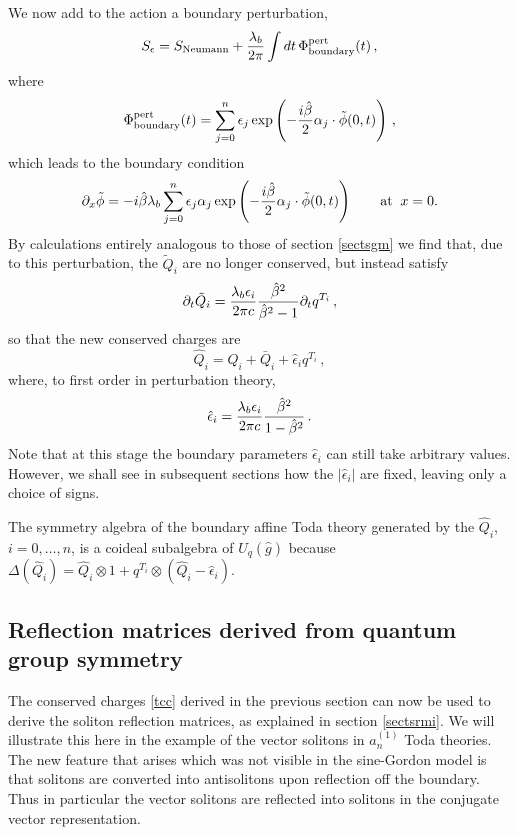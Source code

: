 \documentclass[a4paper,12pt]{article}
\newcommand{\hb}{\hat{\beta}}
\newcommand{\uqgh}{U_q(\hat{g})}
\numberwithin{equation}{section}
\begin{document}
We now add to the action a boundary perturbation, \begin{equation}
S_\epsilon = S_{\rm Neumann} +{\lambda_b\over 2\pi}\int dt\,
\Phi^{\rm pert}_{\rm boundary}(t)\,,\end{equation} where
\begin{equation}\Phi^{\rm pert}_{\rm boundary}(t) = \sum_{j=0}^n
\epsilon_j \exp\left( -{i\hb\over 2}\alpha_j\cdot\tilde{\phi}(0,t)
\right)\,,\end{equation} which leads to the boundary condition
\begin{equation}
\partial_x\tilde{\phi} = -i\hb\lambda_b \sum_{j=0}^n \epsilon_j
\alpha_j\exp\left( -{i\hb\over 2}\alpha_j\cdot\tilde{\phi}(0,t)
\right)\qquad {\rm at}\;\;x=0.\end{equation} By calculations
entirely analogous to those of section \ref{sectsgm} we find that,
due to this perturbation, the $\tilde{Q}_i$ are no longer
conserved, but instead satisfy \begin{equation} \partial_t
\tilde{Q}_i = {\lambda_b\epsilon_i\over 2\pi c} {\hb^2\over
\hb^2-1}\partial_t q^{T_i}\,,\end{equation} so that the new
conserved charges are
\begin{equation}\label{tcc}
  \widehat{Q}_i = Q_i + \bar{Q}_i +
  \hat{\epsilon}_i q^{T_i}\,,
\end{equation}
where, to first order
in perturbation theory,
\begin{equation} \hat{\epsilon}_i =
{\lambda_b\epsilon_i\over 2\pi c} {\hb^2\over 1-\hb^2}\,.
\end{equation}
Note that at this stage the boundary parameters $\hat{\epsilon}_i$
can still take arbitrary values. However, we shall see in
subsequent sections how the $|\hat{\epsilon}_i|$ are fixed,
leaving only a choice of signs.


The symmetry algebra of the boundary affine Toda theory generated
by the $\hat{Q}_i$, $i=0,\dots,n$, is a coideal subalgebra of
$\uqgh$ because $\Delta(\hat{Q}_i)=\hat{Q}_i\otimes
1+q^{T_i}\otimes(\hat{Q}_i-\hat{\epsilon}_i)$.



\subsection{Reflection matrices derived from quantum group
symmetry\label{sectrm}}

The conserved charges \eqref{tcc} derived in the previous section
can now be used to derive the soliton reflection matrices, as
explained in section \ref{sectsrmi}. We will illustrate this here
in the example of the vector solitons in $a_n^{(1)}$ Toda
theories. The new feature that arises which was not visible in the
sine-Gordon model is that solitons are converted into antisolitons
upon reflection off the boundary. Thus in particular the vector
solitons are reflected into solitons in the conjugate vector
representation.
\end{document}
